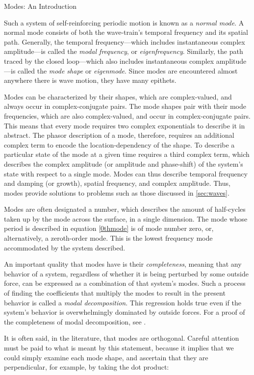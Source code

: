 \documentclass[a4paper,10pt]{report}
\numberwithin{equation}{section}
\begin{document}
{\begin{chapter}
\begin{section}{Modes: An Introduction}
\par
Such a system of self-reinforcing periodic motion is known as a \emph{normal mode}. A normal mode consists of both the wave-train's temporal frequency and its spatial path. Generally, the temporal frequency---which includes instantaneous complex amplitude---is called the \emph{modal frequency}, or \emph{eigenfrequency}. Similarly, the path traced by the closed loop---which also includes instantaneous complex amplitude---is called the \emph{mode shape} or \emph{eigenmode}. Since modes are encountered almost anywhere there is wave motion, they have many epithets. \cite[p.~319]{Cremer1973}
\par
Modes can be characterized by their shapes, which are complex-valued, and always occur in complex-conjugate pairs. The mode shapes pair with their mode frequencies, which are also complex-valued, and occur in complex-conjugate pairs. This means that every mode requires two complex exponentials to describe it in abstract. The phasor description of a mode, therefore, requires an additional complex term to encode the location-dependency of the shape. To describe a particular state of the mode at a given time requires a third complex term, which describes the complex amplitude (or amplitude and phase-shift) of the system's state with respect to a single mode. Modes can thus describe temporal frequency and damping (or growth), spatial frequency, and complex amplitude. Thus, modes provide solutions to problems such as those discussed in \ref{sec:waves}. 
\par
Modes are often designated a number, which describes the amount of half-cycles taken up by the mode across the surface, in a single dimension. The mode whose period is described in equation \eqref{0thmode} is of mode number zero, or, alternatively, a zeroth-order mode. This is the lowest frequency mode accommodated by the system described.
\par
An important quality that modes have is their \emph{completeness}, meaning that any behavior of a system, regardless of whether it is being perturbed by some outside force, can be expressed as a combination of that system's modes. Such a process of finding the coefficients that multiply the modes to result in the present behavior is called a \emph{modal decomposition}. This regression holds true even if the system's behavior is overwhelmingly dominated by outside forces. For a proof of the completeness of modal decomposition, see \cite[p.~281]{Courant1937}.
\par
It is often said, in the literature, that modes are orthogonal. Careful attention must be paid to what is meant by this statement, because it implies that we could simply examine each mode shape, and ascertain that they are perpendicular, for example, by taking the dot product\cite[p.~320]{Cremer1973}:

\end{section}
\end{chapter}}
\end{document}
